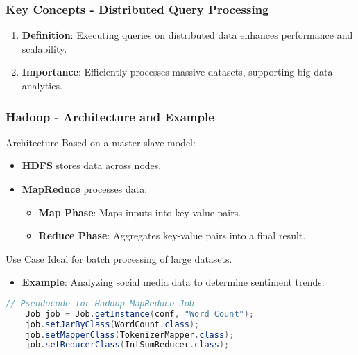 \documentclass[aspectratio=169]{beamer}
\begin{document}
\begin{frame}[fragile]
    \frametitle{Key Concepts - Distributed Query Processing}
    \begin{enumerate}
        \item \textbf{Definition}: Executing queries on distributed data enhances performance and scalability.
        \item \textbf{Importance}: Efficiently processes massive datasets, supporting big data analytics.
    \end{enumerate}
\end{frame}

\begin{frame}[fragile]
    \frametitle{Hadoop - Architecture and Example}
    \begin{block}{Architecture}
        Based on a master-slave model:
        \begin{itemize}
            \item \textbf{HDFS} stores data across nodes.
            \item \textbf{MapReduce} processes data:
            \begin{itemize}
                \item \textbf{Map Phase}: Maps inputs into key-value pairs.
                \item \textbf{Reduce Phase}: Aggregates key-value pairs into a final result.
            \end{itemize}
        \end{itemize}
    \end{block}
    \begin{block}{Use Case}
        Ideal for batch processing of large datasets.
        \begin{itemize}
            \item \textbf{Example}: Analyzing social media data to determine sentiment trends.
        \end{itemize}
    \end{block}
    \begin{lstlisting}[language=Java]
    // Pseudocode for Hadoop MapReduce Job
    Job job = Job.getInstance(conf, "Word Count");
    job.setJarByClass(WordCount.class);
    job.setMapperClass(TokenizerMapper.class);
    job.setReducerClass(IntSumReducer.class);
    \end{lstlisting}
\end{frame}
\end{document}
